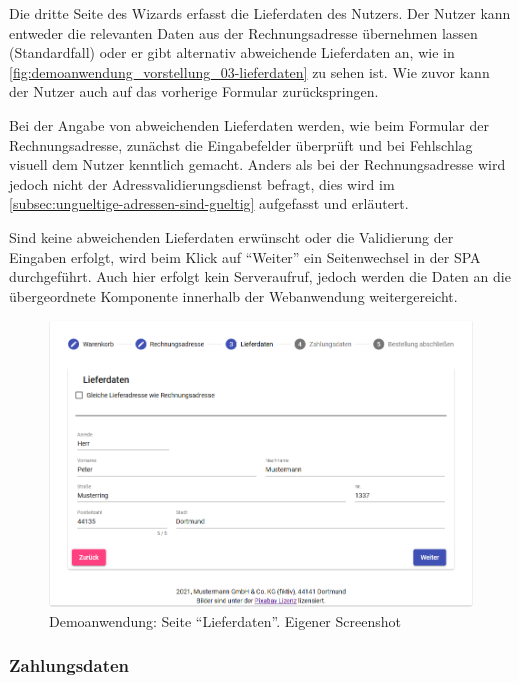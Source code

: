 Die dritte Seite des Wizards erfasst die Lieferdaten des Nutzers. Der Nutzer kann entweder die relevanten Daten aus der Rechnungsadresse übernehmen lassen (Standardfall) oder er gibt alternativ abweichende Lieferdaten an, wie in \autoref{fig:demoanwendung_vorstellung_03-lieferdaten} zu sehen ist. Wie zuvor kann der Nutzer auch auf das vorherige Formular zurückspringen.

Bei der Angabe von abweichenden Lieferdaten werden, wie beim Formular der Rechnungsadresse, zunächst die Eingabefelder überprüft und bei Fehlschlag visuell dem Nutzer kenntlich gemacht. Anders als bei der Rechnungsadresse wird jedoch nicht der Adressvalidierungsdienst befragt, dies wird im \autoref{subsec:ungueltige-adressen-sind-gueltig} aufgefasst und erläutert.

Sind keine abweichenden Lieferdaten erwünscht oder die Validierung der Eingaben erfolgt, wird beim Klick auf \enquote{Weiter} ein Seitenwechsel in der SPA durchgeführt. Auch hier erfolgt kein Serveraufruf, jedoch werden die Daten an die übergeordnete Komponente innerhalb der Webanwendung weitergereicht.

\begin{figure}[H]
	\centering
	\includegraphics[width=1.00\linewidth]{img/04_erstellung-poc/demoanwendung_vorstellung_03-lieferdaten.png}
	\caption{Demoanwendung: Seite \enquote{Lieferdaten}. Eigener Screenshot}
	\label{fig:demoanwendung_vorstellung_03-lieferdaten}
\end{figure}

\subsubsection{Zahlungsdaten}

